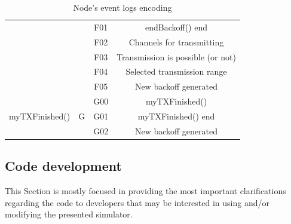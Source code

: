 \documentclass[a4paper]{article}
\begin{document}
\begin{table}[]
\begin{tabular}{|c|c|c|c|}
		                                           &                     & F01               & endBackoff() end                                        \\ \cline{3-4} 
		                                           &                     & F02               & Channels for transmitting                               \\ \cline{3-4} 
		                                           &                     & F03               & Transmission is possible (or not)                       \\ \cline{3-4} 
		                                           &                     & F04               & Selected transmission range                             \\ \cline{3-4} 
		                                           &                     & F05               & New backoff generated                                   \\ \hline
		\multirow{3}{*}{myTXFinished()}            & \multirow{3}{*}{G}  & G00               & myTXFinished()                                          \\ \cline{3-4} 
		                                           &                     & G01               & myTXFinished() end                                      \\ \cline{3-4} 
		                                           &                     & G02               & New backoff generated                                   \\ \hline
		\end{tabular}
		\caption{Node's event logs encoding}
		\label{table:event_coding}
		\end{table}

	\subsection{Code development}
	\label{section:code_development}		
	This Section is mostly focused in providing the most important clarifications regarding the code to developers that may be interested in using and/or modifying the presented simulator.
	
\end{document}

